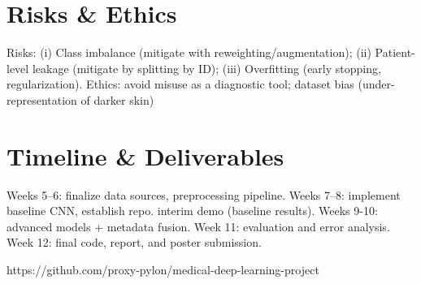 \documentclass[11pt]{article}
\begin{document}
	\section*{Risks \& Ethics}
	Risks: (i) Class imbalance (mitigate with reweighting/augmentation); (ii) Patient-level leakage (mitigate by splitting by ID); (iii) Overfitting (early stopping, regularization). Ethics: avoid misuse as a diagnostic tool; dataset bias (under-representation of darker skin)
	
	\section*{Timeline \& Deliverables}
	Weeks 5–6: finalize data sources, preprocessing pipeline.  
	Weeks 7–8: implement baseline CNN, establish repo. interim demo (baseline results).  
	Weeks 9-10: advanced models + metadata fusion.  
	Week 11: evaluation and error analysis.  
	Week 12: final code, report, and poster submission.
	
	
	\begin{thebibliography}{9}
		https://github.com/proxy-pylon/medical-deep-learning-project
	\end{thebibliography}
	
\end{document}
